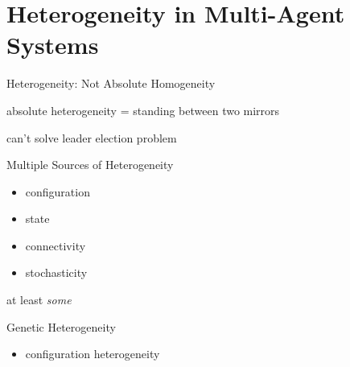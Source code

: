 \section{Heterogeneity in Multi-Agent Systems}

\begin{frame}{Heterogeneity: Not Absolute Homogeneity}

absolute heterogeneity = standing between two mirrors

can't solve leader election problem \cite{angluin1980local,banda2015configuration}

\end{frame}

\begin{frame}{Multiple Sources of Heterogeneity}

\begin{itemize}
\item configuration \cite{frederickson1987electing}
\item state \cite{banda2015configuration}
\item connectivity \cite{antonoiu1996self}
\item stochasticity \cite{itai1981symmetry}
\end{itemize}

at least \textit{some}

\end{frame}

\begin{frame}{Genetic Heterogeneity}

\begin{itemize}
\item configuration heterogeneity
\end{itemize}

\end{frame}
